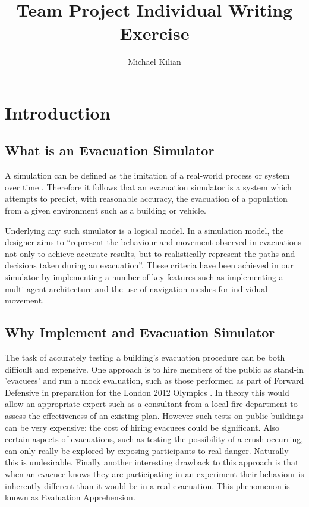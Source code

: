 \documentclass{article}
\begin{document}
\title{Team Project Individual Writing Exercise}
\author{Michael Kilian}
\maketitle
\tableofcontents
\section{Introduction}
\subsection{What is an Evacuation Simulator}
A simulation can be defined as the imitation of a real-world process or system over time \cite{DiscreteEvent}.
Therefore it follows that an evacuation simulator is a system which attempts
to predict, with reasonable accuracy, the evacuation of a population from a given environment such as a building or vehicle.

Underlying any such simulator is a logical model. In a simulation model, the designer aims to
``represent the behaviour and movement observed in evacuations not only to achieve accurate results,
but to realistically represent the paths and decisions taken during an evacuation''\cite{MethodReview}. These criteria have been
achieved in our simulator by implementing a number of key features such as implementing a multi-agent architecture and the use of navigation meshes
for individual movement.

\subsection{Why Implement and Evacuation Simulator}
The task of accurately testing a building's evacuation procedure can be
both difficult and expensive. One approach is to hire members of the public
as stand-in 'evacuees' and run a mock evaluation, such as those performed as part of Forward Defensive
in preparation for the London 2012 Olympics \cite{DailyMailEvacuation}. In theory this would allow an 
appropriate expert such as a consultant from a local fire department to assess the effectiveness
of an existing plan. However such tests on public buildings can be very expensive: the cost
of hiring evacuees could be significant. Also certain aspects of evacuations, such
as testing the possibility of a crush occurring, can only really be explored by exposing participants
to real danger. Naturally this is undesirable. Finally another interesting drawback 
to this approach is that when an evacuee knows they are participating in an experiment
their behaviour is inherently different than it would be in a real evacuation. This
phenomenon is known as Evaluation Apprehension\cite{EvalApprehension}. \\
\end{document}
